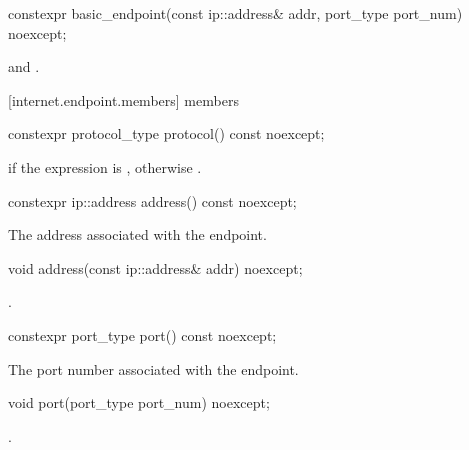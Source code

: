 \begin{itemdecl}
constexpr basic_endpoint(const ip::address& addr,
                         port_type port_num) noexcept;
\end{itemdecl}

\begin{itemdescr}
\pnum
\postconditions {} and .
\end{itemdescr}



[internet.endpoint.members]{ members}

\begin{itemdecl}
constexpr protocol_type protocol() const noexcept;
\end{itemdecl}

\begin{itemdescr}
\pnum
\returns {} if the expression  is , otherwise .
\end{itemdescr}

\begin{itemdecl}
constexpr ip::address address() const noexcept;
\end{itemdecl}

\begin{itemdescr}
\pnum
\returns The address associated with the endpoint.
\end{itemdescr}

\begin{itemdecl}
void address(const ip::address& addr) noexcept;
\end{itemdecl}

\begin{itemdescr}
\pnum
\postconditions {}.
\end{itemdescr}

\begin{itemdecl}
constexpr port_type port() const noexcept;
\end{itemdecl}

\begin{itemdescr}
\pnum
\returns The port number associated with the endpoint.
\end{itemdescr}

\begin{itemdecl}
void port(port_type port_num) noexcept;
\end{itemdecl}

\begin{itemdescr}
\pnum
\postconditions {}.
\end{itemdescr}




